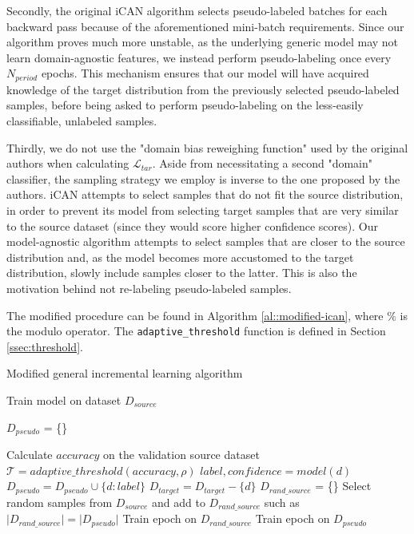 \documentclass{article}
\newcommand{\loss}{\mathcal{L}}
\newcommand{\threshold}{\mathcal{T}}
\begin{document}
	Secondly, the original iCAN algorithm selects pseudo-labeled batches for each backward pass because of the aforementioned mini-batch requirements. Since our algorithm proves much more unstable, as the underlying generic model may not learn domain-agnostic features, we instead perform pseudo-labeling once every $N_{period}$ epochs. This mechanism ensures that our model will have acquired knowledge of the target distribution from the previously selected pseudo-labeled samples, before being asked to perform pseudo-labeling on the less-easily classifiable, unlabeled samples.
	
	Thirdly, we do not use the "domain bias reweighing function" used by the original authors when calculating $\loss_{tar}$. Aside from necessitating a second "domain" classifier, the sampling strategy we employ is inverse to the one proposed by the authors. iCAN attempts to select samples that do not fit the source distribution, in order to prevent its model from selecting target samples that are very similar to the source dataset (since they would score higher confidence scores). Our model-agnostic algorithm attempts to select samples that are closer to the source distribution and, as the model becomes more accustomed to the target distribution, slowly include samples closer to the latter. This is also the motivation behind not re-labeling pseudo-labeled samples.
		
	The modified procedure can be found in Algorithm \ref{al::modified-ican}, where $\%$ is the modulo operator. The \texttt{adaptive\_threshold} function is defined in Section \ref{ssec:threshold}.
	
	\begin{algorithm}
		\caption{Modified general incremental learning algorithm} 
		\label{al::modified-ican}
		\begin{algorithmic}[1]	
			\State Train model on dataset $D_{source}$
			
			\State $D_{pseudo}$ = \{\}
			
					\State Calculate $accuracy$ on the validation source dataset
					\State $\threshold = adaptive\_threshold(accuracy, \rho)$
						\State $label, confidence = model(d)$
						\If{$confidence > \threshold$}
							\State $D_{pseudo} = D_{pseudo} \cup \{d: label\}$
							\State $D_{target} = D_{target} - \{d\}$
						\EndIf
					\EndFor
				\EndIf
				\State $D_{rand\_source}$ = \{\}
				\State Select random samples from $D_{source}$ and add to $D_{rand\_source}$ such as $\lvert D_{rand\_source} \rvert = \lvert D_{pseudo} \rvert$
				\State Train epoch on $D_{rand\_source}$
				\State Train epoch on $D_{pseudo}$
			\EndFor
			
		\end{algorithmic} 
	\end{algorithm}
\end{document}
